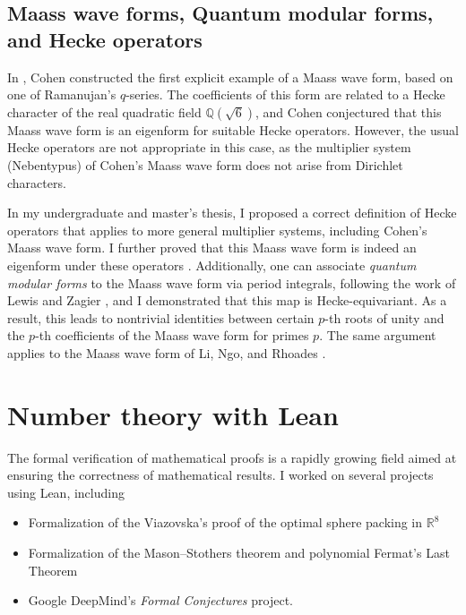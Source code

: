 \documentclass[letterpaper, 10pt]{article}
\begin{document}
\subsection{Maass wave forms, Quantum modular forms, and Hecke operators}


In \cite{cohen1988q}, Cohen constructed the first explicit example of a Maass wave form, based on one of Ramanujan's $q$-series. The coefficients of this form are related to a Hecke character of the real quadratic field $\mathbb{Q}(\sqrt{6})$, and Cohen conjectured that this Maass wave form is an eigenform for suitable Hecke operators. However, the usual Hecke operators are not appropriate in this case, as the multiplier system (Nebentypus) of Cohen's Maass wave form does not arise from Dirichlet characters.

In my undergraduate and master's thesis, I proposed a correct definition of Hecke operators that applies to more general multiplier systems, including Cohen's Maass wave form. I further proved that this Maass wave form is indeed an eigenform under these operators \cite{lee2018quantum,lee2019maass}. Additionally, one can associate \emph{quantum modular forms} to the Maass wave form via period integrals, following the work of Lewis and Zagier \cite{lewis2001period,zagier2010quantum}, and I demonstrated that this map is Hecke-equivariant. As a result, this leads to nontrivial identities between certain $p$-th roots of unity and the $p$-th coefficients of the Maass wave form for primes $p$. The same argument applies to the Maass wave form of Li, Ngo, and Rhoades \cite{li2013renormalization}.


\section{Number theory with Lean}

The formal verification of mathematical proofs is a rapidly growing field aimed at ensuring the correctness of mathematical results.
I worked on several projects using Lean, including
\begin{itemize}
  \item Formalization of the Viazovska's proof of the optimal sphere packing in $\mathbb{R}^{8}$
  \item Formalization of the Mason--Stothers theorem and polynomial Fermat's Last Theorem
  \item Google DeepMind's \emph{Formal Conjectures} project.
\end{itemize}
\end{document}
